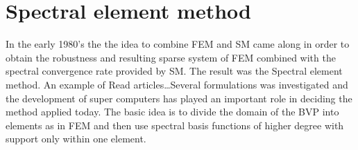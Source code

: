 
\section{Spectral element method}
In the early 1980's the the idea to combine FEM and SM came along in order to obtain the robustness and resulting sparse system of FEM 
combined with the spectral convergence rate provided by SM. 
The result was the Spectral element method. An example of Read articles\ldots Several formulations was investigated 
and the development of super computers has played an important role in deciding the method applied today. 
The basic idea is to divide the domain of the BVP into elements as in FEM and then use spectral basis 
functions of higher degree with support only within one element. 


